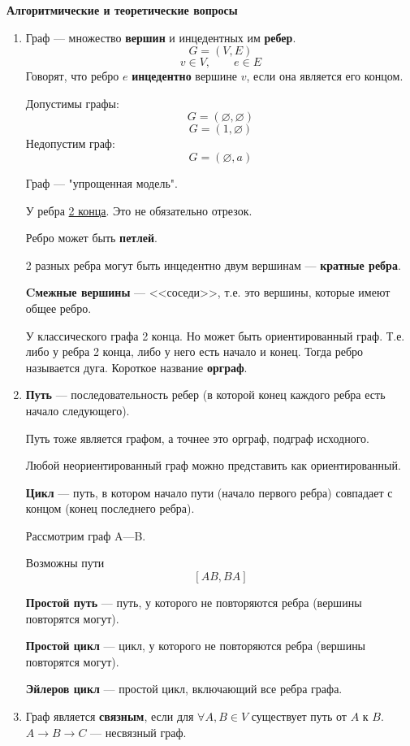 \documentclass[a4paper,12pt]{article}
\theoremstyle{plain} %
\theoremstyle{definition} %
\theoremstyle{remark} %
\newcounter{num}
\begin{document}
\begin{center}
	\textbf{Алгоритмические и теоретические вопросы}
\end{center}
\begin{enumerate}
\item Граф --- множество \textbf{вершин} и инцедентных им \textbf{ребер}.
$$G=(V, E)$$
$$v \in V, \qquad e \in E $$
Говорят, что ребро $e$ \textbf{инцедентно} вершине $v$, если она является его концом.

Допустимы графы:
$$G = (\varnothing, \varnothing)$$
$$G = ({1}, \varnothing)$$
Недопустим граф:
$$G = (\varnothing, {a})$$

Граф --- "упрощенная модель".

У ребра \underline{2 конца}. Это не обязательно отрезок. 

Ребро может быть \textbf{петлей}.

2 разных ребра могут быть инцедентно двум вершинам --- \textbf{кратные ребра}.

\textbf{Cмежные вершины} --- <<соседи>>, т.е. это вершины, которые имеют общее ребро.

У классического графа 2 конца. Но может быть ориентированный граф. Т.е. либо у ребра 2 конца, либо у него есть начало и конец. Тогда ребро называется дуга. Короткое название \textbf{орграф}.

\item \textbf{Путь} --- последовательность ребер (в которой конец каждого ребра есть начало следующего).

Путь тоже является графом, а точнее это орграф, подграф исходного.

Любой неориентированный граф можно представить как ориентированный.

\textbf{Цикл} --- путь, в котором начало пути (начало первого ребра) совпадает с концом (конец последнего ребра).

Рассмотрим граф A---B.

Возможны пути
$$[AB, BA]$$

\textbf{Простой путь} --- путь, у которого не повторяются ребра (вершины повторятся могут).

\textbf{Простой цикл} ---  цикл, у которого не повторяются ребра (вершины повторятся могут).

\textbf{Эйлеров цикл} --- простой цикл, включающий все ребра графа.

\item Граф является \textbf{связным}, если для $\forall A,B \in V$ существует путь от $A$ к $B$.\\
$A\longrightarrow B\longrightarrow C$ --- несвязный граф.


\end{enumerate}
\end{document}
